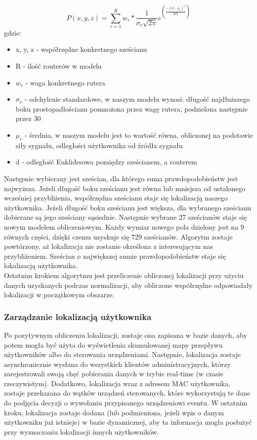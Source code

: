 \begin{equation}
P(x,y,z) = \sum_{r=1}^{R} w_r * \frac{1}{\sigma_r\sqrt{2\pi}}e^{\left(\frac{-(d-\mu_r)^2}{2\sigma_r^2}\right)}
\end{equation}
gdzie:
\begin{itemize}
	\item x, y, z - współrzędne konkretnego sześcianu
	\item R - ilość routerów w modelu
	\item $w_r$ - waga konkretnego rutera
	\item $\sigma_r$ - odchylenie standardowe, w naszym modelu wynosi: długość najdłuższego boku prostopadłościanu pomnożona przez wagę rutera, podzielona następnie przez 30
	\item $\mu_r$ - średnia, w naszym modelu jest to wartość równa, obliczonej na podstawie siły sygnału, odległości użytkownika od źródła sygnału
	\item d - odległość Euklidesowa pomiędzy sześcianem, a routerem
\end{itemize}
Następnie wybierany jest sześcian, dla którego suma prawdopodobieństw jest najwyższa. Jeżeli długość boku sześcianu jest równa lub mniejsza od ustalonego wcześniej przybliżenia, współrzędna sześcianu staje się lokalizacją naszego użytkownika. Jeżeli długość boku sześcianu jest większa, dla wybranego sześcianu dobierane są jego sześciany sąsiednie. Następnie wybrane 27 sześcianów staje się nowym modelem obliczeniowym. Każdy wymiar nowego pola dzielony jest na 9 równych części, dzięki czemu uzyskuje się 729 sześcianów. Algorytm zostaje powtórzony, aż lokalizacja nie zostanie określona z interesującym nas przybliżeniem. Sześcian o największej sumie prawdopodobieństw staje się lokalizacją użytkownika.\\
Ostatnim krokiem algorytmu jest przeliczenie obliczonej lokalizacji przy użyciu danych uzyskanych podczas normalizacji, aby obliczone współrzędne odpowiadały lokalizacji w początkowym obszarze.
\subsubsection{Zarządzanie lokalizacją użytkownika}
Po pozytywnym obliczeniu lokalizacji, zostaje ona zapisana w bazie danych, aby potem mogła być użyta do wyświetlenia skumulowanej mapy przepływu użytkowników albo do sterowania urządzeniami. Następnie, lokalizacja zostaje asynchronicznie wysłana do wszystkich klientów administracyjnych, którzy zarejestrowali swoją chęć pobierania danych w trybie real-time (w czasie rzeczywistym). Dodatkowo, lokalizacja wraz z adresem MAC użytkownika, zostaje przekazana do wątków urządzeń sterowanych, które wykorzystują te dane do podjęcia decyzji o wywołaniu przypisanego urządzeniowi eventu. W ostatnim kroku, lokalizacja zostaje dodana (lub podmieniona, jeżeli wpis o danym użytkowniku już istnieje) w bazie dynamicznej, aby ta informacja mogła posłużyć przy wyznaczaniu lokalizacji innych użytkowników.
